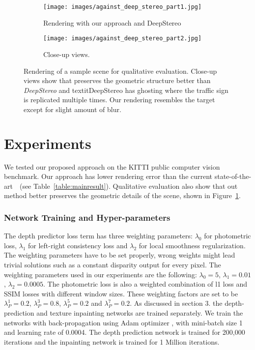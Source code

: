 \documentclass[runningheads]{llncs}
\newcommand{\squeezeup}{\vspace{-5.5mm}}
\begin{document}
\begin{figure}[htb!]
  \centering
  \begin{subfigure}{\linewidth}
    \centering
    \texttt{[image: images/against\_deep\_stereo\_part1.jpg]}
    \caption{Rendering with our approach and DeepStereo \cite{flynn2015deepstereo} }
  \end{subfigure}
\vspace{0.5cm}
  \begin{subfigure}{\linewidth}
    \centering
    \texttt{[image: images/against\_deep\_stereo\_part2.jpg]}
    \caption{Close-up views.}
  \end{subfigure}
  \caption{Rendering of a sample scene for qualitative evaluation. Close-up views show that preserves the geometric structure better than \textit{DeepStereo} and textit{DeepStereo} has ghosting where the traffic sign is replicated multiple times. Our rendering resembles the target except for slight amount of blur.}
  \label{fig:qualitative}
\end{figure}
\squeezeup

\section{Experiments}
We tested our proposed approach on the KITTI \cite{geiger2012we} public computer vision benchmark. Our approach has lower rendering error than the current state-of-the-art~\cite{flynn2015deepstereo}~(see Table~\ref{table:mainresult}). Qualitative evaluation also show that out method better preserves the geometric details of the scene, shown in Figure~\ref{fig:qualitative}. 
\subsubsection*{Network Training and Hyper-parameters}
The depth predictor loss term has three weighting parameters: $\lambda_{0}$ for photometric loss, $\lambda_{1}$ for left-right consistency loss and $\lambda_{2}$ for local smoothness regularization. The weighting parameters have to be set properly, wrong weights might lead trivial solutions such as a constant disparity output for every pixel. The weighting parameters used in our experiments are the following: $\lambda_{0}=5$, $\lambda_{1}=0.01$, $\lambda_{2}=0.0005$. The photometric loss is also a weighted combination of l1 loss and SSIM losses with different window sizes. These weighting factors are set to be $\lambda^{1}_{P}=0.2$, $\lambda^{3}_{P}=0.8$, $\lambda^{5}_{P}=0.2$ and $\lambda^{7}_{P}=0.2$. As discussed in section 3. the depth-prediction and texture inpainting networks are trained separately. We train the networks with back-propagation using Adam optimizer \cite{kingma2014adam}, with mini-batch size 1 and learning rate of 0.0004. The depth prediction network is trained for 200,000 iterations and the inpainting network is trained for 1 Million iterations.
\end{document}
